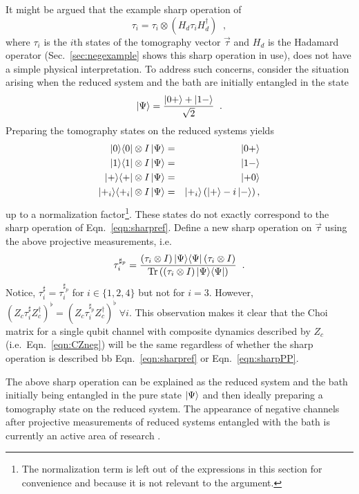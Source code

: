 It might be argued that the example sharp operation of 
\begin{equation}
\label{eqn:sharpref}
\tau_i = \tau_i\otimes \left(H_d\tau_i H_d^\dagger \right)\;\;,
\end{equation}
where $\tau_i$ is the $i$th states of the tomography vector $\vec{\tau}$ and $H_d$ is the Hadamard operator (Sec.\ \ref{sec:negexample} shows this sharp operation in use), does not have a simple physical interpretation.  To address such concerns, consider the situation arising when the reduced system and the bath are initially entangled in the state
$$
\left|\Psi\right\rangle = \frac{\left|0+\right\rangle+\left|1-\right\rangle}{\sqrt{2}}\;\;.
$$
Preparing the tomography states on the reduced systems yields
\begin{eqnarray*}
|0\rangle\langle0|\otimes I\left|\Psi\right\rangle &=& \left|0+\right\rangle\\
|1\rangle\langle1|\otimes I\left|\Psi\right\rangle &=& \left|1-\right\rangle\\
|+\rangle\langle+|\otimes I\left|\Psi\right\rangle &=& \left|+0\right\rangle\\
|+_i\rangle\langle+_i|\otimes I\left|\Psi\right\rangle &=& \left|+_i\right\rangle\left(\left|+\right\rangle-i\left|-\right\rangle\right),
\end{eqnarray*}
up to a normalization factor\footnote{The normalization term is left out of the expressions in this section for convenience and because it is not relevant to the argument.}.  These states do not exactly correspond to the sharp operation of Eqn.\ \ref{eqn:sharpref}.  Define a new sharp operation on $\vec{\tau}$ using the above projective measurements, i.e.\
\begin{equation}
\label{eqn:sharpPP}
\tau_i^{\sharp_p} = \frac{\left(\tau_i\otimes I\right) |\Psi\rangle\langle\Psi| \left(\tau_i\otimes I\right)}{\operatorname{Tr}{\left(\left(\tau_i\otimes I\right)|\Psi\rangle\langle\Psi|\right)}}\;\;.
\end{equation}
Notice, $\tau_i^\sharp=\tau_i^{\sharp_p}$ for $i\in\{1,2,4\}$ but not for $i=3$.  However, $\left(Z_c\tau_{i}^\sharp Z_c^\dagger\right)^\flat = \left(Z_c\tau_{i}^{\sharp_p} Z_c^\dagger\right)^\flat\;\forall i$.  This observation makes it clear that the Choi matrix for a single qubit channel with composite dynamics described by $Z_c$ (i.e.\ Eqn.\ \ref{eqn:CZneg}) will be the same regardless of whether the sharp operation is described bb Eqn.\ \ref{eqn:sharpref} or Eqn.\ \ref{eqn:sharpPP}.

The above sharp operation can be explained as the reduced system and the bath initially being entangled in the pure state $\left|\Psi\right\rangle$ and then ideally preparing a tomography state on the reduced system.  The appearance of negative channels after projective measurements of reduced systems entangled with the bath is currently an active area of research \cite{Devi2011}.

